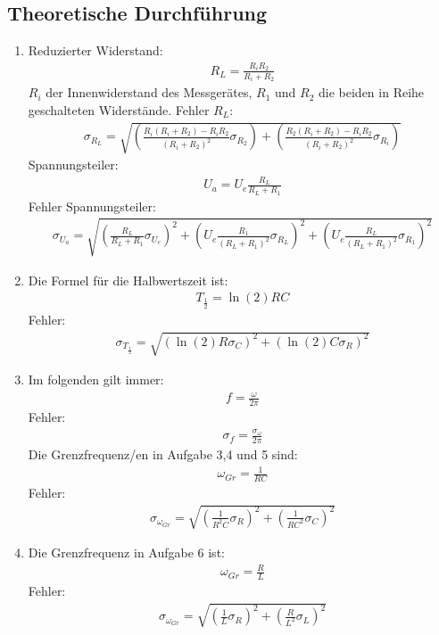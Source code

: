 \documentclass[12pt]{scrartcl}
\begin{document}
\subsection{Theoretische Durchführung}
\begin{enumerate}
\item
Reduzierter Widerstand:
\begin{align}
R_L = \frac{R_i R_2}{R_i + R_2}
\label{eqn:para}
\end{align}
$R_i$ der Innenwiderstand des Messgerätes,
$R_1$ und $R_2$ die beiden in Reihe geschalteten Widerstände.
Fehler $R_L$:
\begin{align}
\sigma_{R_L} = \sqrt{
\left(\frac{R_i(R_i+R_2)-R_i R_2}{(R_i + R_2)^2}\sigma_{R_2}\right)+
\left(\frac{R_2(R_i+R_2)-R_i R_2}{(R_i + R_2)^2}\sigma_{R_i}\right)}
\label{eqn:para_sigma}
\end{align}
Spannungsteiler:
\begin{align}
U_a = U_e \frac{R_L}{R_L + R_1}
\label{eqn:spannungsteiler}
\end{align}
Fehler Spannungsteiler:
\begin{align}
\sigma_{U_a} = \sqrt{
\left(\frac{R_L}{R_L + R_1}\sigma_{U_e}\right)^2+
\left(U_e \frac{R_1}{(R_L + R_1)^2}\sigma_{R_L}\right)^2+
\left(U_e \frac{R_L}{(R_L + R_1)^2}\sigma_{R_1}\right)^2}
\label{eqn:spannungsteiler_sigma}
\end{align}
\item
Die Formel für die Halbwertszeit ist:
\begin{align}
T_{\frac{1}{2}} = \ln(2)RC
\label{eqn:halbzeit}
\end{align}
Fehler:
\begin{align}
\sigma_{T_{\frac{1}{2}}} = \sqrt{
\left(\ln(2)R\sigma_{C}\right)^2+
\left(\ln(2)C\sigma_{R}\right)^2}
\label{eqn:halbzeit_sigma}
\end{align}
\item
Im folgenden gilt immer:
\begin{align}
f = \frac{\omega}{2\pi}
\end{align}
Fehler:
\begin{align}
\sigma_{f} = \frac{\sigma_{\omega}}{2\pi}
\end{align}
Die Grenzfrequenz/en in Aufgabe 3,4 und 5 sind:
\begin{align}
\omega_{Gr} = \frac{1}{RC}
\label{eqn:omega_g}
\end{align}
Fehler:
\begin{align}
\sigma_{\omega_{Gr}} = \sqrt{
\left(\frac{1}{R^2C}\sigma_R\right)^2+
\left(\frac{1}{RC^2}\sigma_C\right)^2}
\label{eqn:omega_g_sigma}
\end{align}
\item
Die Grenzfrequenz in Aufgabe 6 ist:
\begin{align}
\omega_{Gr} = \frac{R}{L}
\end{align}
Fehler:
\begin{align}
\sigma_{\omega_{Gr}} = \sqrt{\left(\frac{1}{L}\sigma_R\right)^2+\left(\frac{R}{L^2}\sigma_L\right)^2}
\end{align}

\end{enumerate}
\end{document}
